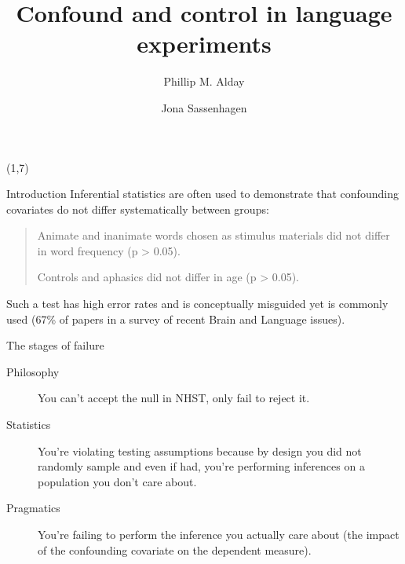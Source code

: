 \documentclass[final]{beamer}
\title{Confound and control in language experiments}
\author{Phillip M. Alday  \and Jona Sassenhagen}
\institute{University of South Australia}
\date{}
\begin{document}
\begin{frame}{} 	


\begin{textblock}{48}(1,7)

\begin{block}{Introduction}
Inferential statistics are often used to demonstrate that  confounding covariates do not differ systematically between groups:

\begin{quote}
Animate and inanimate words chosen as stimulus materials did not differ in word frequency (p > 0.05).

Controls and aphasics did not differ in age (p > 0.05).
\end{quote}


Such a test has high error rates and is conceptually misguided yet is commonly used (67\% of papers in a survey of recent Brain and Language issues).
\end{block}

\begin{block}{The stages of failure}
\begin{description}
\item[Philosophy] You can’t accept the null in NHST, only fail to reject it.
\item[Statistics] You’re violating testing assumptions because by design you did not randomly sample and even if had, you're performing inferences on a population you don’t care about.
\item[Pragmatics] You’re failing to perform the inference you actually care about (the impact of the confounding covariate on the dependent measure).
\end{description}
\end{block}


\end{textblock}
\end{frame}
\end{document}
